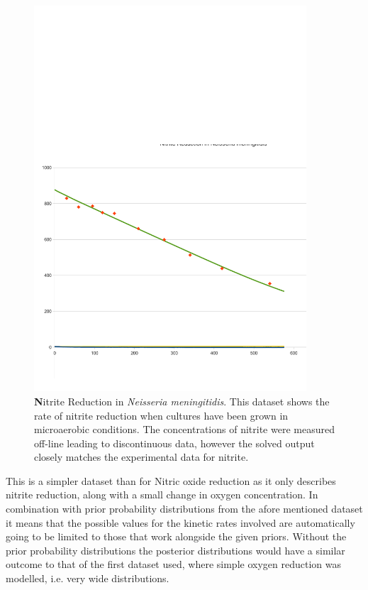 \begin{figure}[ht!]
 \centering
 \includegraphics[width=4in]{./07-nitritereduction/data/no2sim.pdf}
 \caption{\footnotesize {\textbf Nitrite Reduction in \textit{Neisseria meningitidis}.} This dataset shows the rate of nitrite reduction when cultures have been grown in microaerobic conditions. The concentrations of nitrite were measured off-line leading to discontinuous data, however the solved output closely matches the experimental data for nitrite.}
 \label{fig:no2sim}
\end{figure}

This is a simpler dataset than for Nitric oxide reduction as it only describes nitrite reduction, along with a small change in oxygen concentration. In combination with prior probability distributions from the afore mentioned dataset it means that the possible values for the kinetic rates involved are automatically going to be limited to those that work alongside the given priors. Without the prior probability distributions the posterior distributions would have a similar outcome to that of the first dataset used, where simple oxygen reduction was modelled, i.e. very wide distributions.

